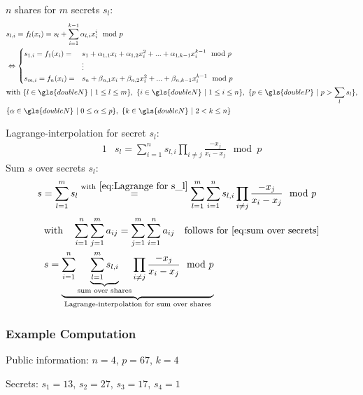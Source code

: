 $n$ shares for $m$ secrets $s_l$:
\begin{alignat}{1}
&s_{l,i} = f_l(x_i) = s_l + \sum_{i=1}^{k-1} \alpha_{l,i} x_i^i \mod p \\
& \Leftrightarrow \begin{cases}
s_{1,i} = f_1(x_i) = & s_1 + \alpha_{1,1} x_i + \alpha_{1,2} x_i^2 + ... + \alpha_{1,k-1}x_i^{k-1} \mod p \\
&\vdots \\
s_{m,i} = f_n(x_i) = & s_n + \beta_{n,1} x_i + \beta_{n,2} x_i^2 + ... + \beta_{n,k-1}x_i^{k-1} \mod p
\end{cases} \nonumber \\
& \text{with} \ \{l \in \gls{doubleN} \ | \ 1 \leq l \leq m \},
\ \{i \in \gls{doubleN} \ | \ 1 \leq i \leq n \},
\ \{ p \in \gls{doubleP} \ | \ p > \sum_l s_l \}, \nonumber \\
&\{ \alpha \in \gls{doubleN} \ | \ 0 \leq \alpha \leq p \},
\ \{k \in \gls{doubleN} \ | \ 2 < k \leq n \} \nonumber
\end{alignat}

Lagrange-interpolation for secret $s_l$:
\begin{alignat}{1}
&s_l = \sum_{i=1}^{n}s_{l,i}\prod_{i\neq j}\frac{-x_j}{x_i - x_j} \mod p \label{eq:Lagrange for s_l}
\end{alignat}
Sum $s$ over secrets $s_l$:
\begin{alignat}{1}
&s = \sum_{l=1}^{m} s_l \overset{\text{with} \ \ref{eq:Lagrange for s_l}}{=} \sum_{l=1}^{m} \sum_{i=1}^{n} s_{l,i}\prod_{i\neq j} \frac{-x_j}{x_i-x_j} \mod p \label{eq:sum over secrets}
\end{alignat}
\begin{alignat}{1}
&\text{with} \quad \sum_{i=1}^{n}\sum_{j=1}^{m}a_{ij} = \sum_{j=1}^{m}\sum_{i=1}^{n}a_{ij} \quad \text{follows for \ref{eq:sum over secrets}} \nonumber\\
&s= \underbrace{ \sum_{i=1}^n \underbrace{\sum_{l=1}^{m} s_{l,i}}_{\text{sum over shares}} \prod_{i\neq j} \frac{-x_j}{x_i-x_j} \mod p }_{\text{Lagrange-interpolation for sum over shares}}
\end{alignat}	

\subsubsection*{Example Computation}
Public information: $n=4$, $p=67$, $k=4$\par

\noindent Secrets: $s_1=13$, $s_2=27$, $s_3=17$, $s_4=1$\par

